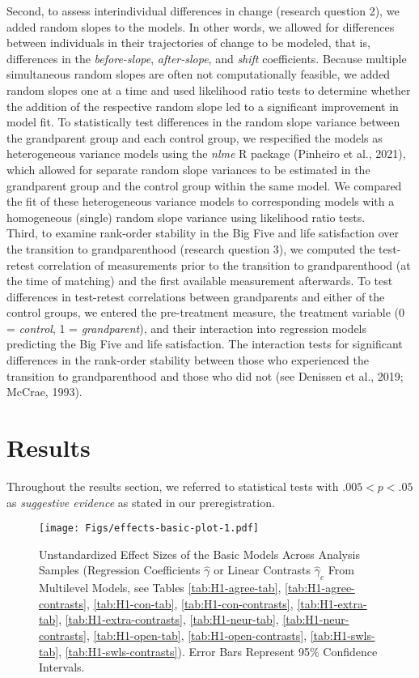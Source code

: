 \documentclass[
  english,
  man, noextraspace,floatsintext]{apa7}
\begin{document}
Second, to assess interindividual differences in change (research question 2), we added random slopes to the models. In other words, we allowed for differences between individuals in their trajectories of change to be modeled, that is, differences in the \emph{before-slope}, \emph{after-slope}, and \emph{shift} coefficients. Because multiple simultaneous random slopes are often not computationally feasible, we added random slopes one at a time and used likelihood ratio tests to determine whether the addition of the respective random slope led to a significant improvement in model fit. To statistically test differences in the random slope variance between the grandparent group and each control group, we respecified the models as heterogeneous variance models using the \emph{nlme} R package (Pinheiro et al., 2021), which allowed for separate random slope variances to be estimated in the grandparent group and the control group within the same model. We compared the fit of these heterogeneous variance models to corresponding models with a homogeneous (single) random slope variance using likelihood ratio tests.\\
Third, to examine rank-order stability in the Big Five and life satisfaction over the transition to grandparenthood (research question 3), we computed the test-retest correlation of measurements prior to the transition to grandparenthood (at the time of matching) and the first available measurement afterwards. To test differences in test-retest correlations between grandparents and either of the control groups, we entered the pre-treatment measure, the treatment variable (0 = \emph{control}, 1 = \emph{grandparent}), and their interaction into regression models predicting the Big Five and life satisfaction. The interaction tests for significant differences in the rank-order stability between those who experienced the transition to grandparenthood and those who did not (see Denissen et al., 2019; McCrae, 1993).

\hypertarget{results}{%
\section{Results}\label{results}}

Throughout the results section, we referred to statistical tests with \(.005 < p < .05\) as \emph{suggestive evidence} as stated in our preregistration.



\begin{figure}
\centering
\texttt{[image: Figs/effects-basic-plot-1.pdf]}
\caption{\label{fig:effects-basic-plot}Unstandardized Effect Sizes of the Basic Models Across Analysis Samples (Regression Coefficients \(\hat{\gamma}\) or Linear Contrasts \(\hat{\gamma}_{c}\) From Multilevel Models, see Tables \ref{tab:H1-agree-tab}, \ref{tab:H1-agree-contrasts}, \ref{tab:H1-con-tab}, \ref{tab:H1-con-contrasts}, \ref{tab:H1-extra-tab}, \ref{tab:H1-extra-contrasts}, \ref{tab:H1-neur-tab}, \ref{tab:H1-neur-contrasts}, \ref{tab:H1-open-tab}, \ref{tab:H1-open-contrasts}, \ref{tab:H1-swls-tab}, \ref{tab:H1-swls-contrasts}). Error Bars Represent 95\% Confidence Intervals.}
\end{figure}
\end{document}

